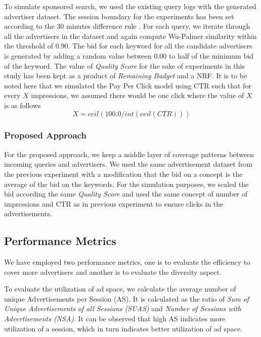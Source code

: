 To simulate sponsored search, we used the existing query logs with the generated advertiser dataset. The session boundary for the experiments has been set according to the 30 minutes difference rule \cite{chau2005analysis}. For each query, we iterate through all the advertisers in the dataset and again compute Wu-Palmer similarity within the threshold of $0.90$. The bid for each keyword for all the candidate advertisers is generated by adding a random value between 0.00 to half of the minimum bid of the keyword. The value of {\it Quality Score} for the sake of experiments in this study has been kept as a product of {\it Remaining Budget} and a NRF. It is to be noted here that we simulated the Pay Per Click model using CTR such that for every $X$ impressions, we assumed there would be one click where the value of $X$ is as follows  
\begin{equation}
X=  ceil(100.0 / int(ceil(CTR))) 
\end{equation}



\subsubsection{Proposed Approach}
For the proposed approach, we keep a middle layer of coverage patterns between incoming queries and advertisers. We used the same advertisement dataset from the previous experiment with a modification that the bid on a concept is the average of the bid on the keywords. For the simulation purposes, we scaled the bid according the same {\it Quality Score}  and used the same concept of number of impressions and CTR as in previous experiment to ensure clicks in the advertisements. \par

\subsection{Performance Metrics}

We have employed two performance metrics, one is to evaluate the efficiency to cover more advertisers and another is to evaluate the diversity aspect. 

To evaluate the utilization of ad space, we calculate the average number of unique Advertisements per Session (AS). It is calculated as the ratio of {\it Sum of Unique Advertisements of all Sessions (SUAS)} and {\it Number of Sessions with Advertisements (NSA)}. It can be observed that high AS indicates more utilization of a session, which in turn indicates better utilization of ad space.


